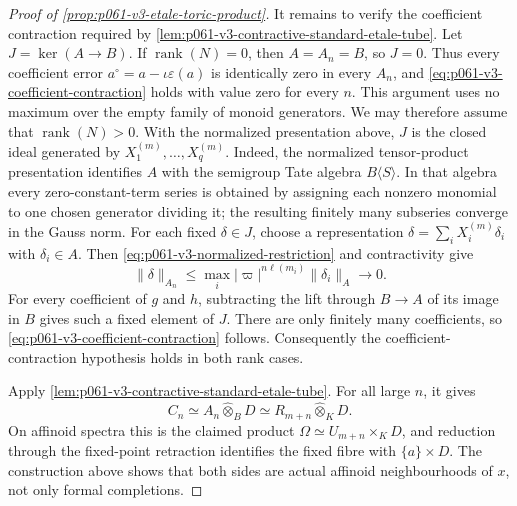 \begin{proof}[Proof of \cref{prop:p061-v3-etale-toric-product}]
It remains to verify the coefficient contraction required by
\cref{lem:p061-v3-contractive-standard-etale-tube}. Let
\(J=\ker(A\to B)\). If \(\operatorname{rank}(N)=0\), then
\(A=A_n=B\), so \(J=0\). Thus every coefficient error
\(a^\circ=a-\iota\varepsilon(a)\) is identically zero in every \(A_n\), and
\eqref{eq:p061-v3-coefficient-contraction} holds with value zero for every
\(n\). This argument uses no maximum over the empty family of monoid
generators. We may therefore assume that \(\operatorname{rank}(N)>0\).
With the normalized presentation above, \(J\) is the
closed ideal generated by \(X_1^{(m)},\ldots,X_q^{(m)}\). Indeed, the
normalized tensor-product presentation identifies \(A\) with the semigroup
Tate algebra \(B\langle S\rangle\). In that algebra every
zero-constant-term series is obtained by
assigning each nonzero monomial to one chosen generator dividing it; the
resulting finitely many subseries converge in the Gauss norm. For each fixed
\(\delta\in J\), choose a representation
\(\delta=\sum_iX_i^{(m)}\delta_i\) with \(\delta_i\in A\). Then
\eqref{eq:p061-v3-normalized-restriction} and contractivity give
\begin{equation}\label{eq:p061-v3-explicit-kernel-decay}
 \|\delta\|_{A_n}
 \leq\max_i
   |\varpi|^{n\ell(m_i)}\|\delta_i\|_A
 \longrightarrow0.
\end{equation}
For every coefficient of \(g\) and \(h\), subtracting the lift through
\(B\to A\) of its image in \(B\) gives such a fixed element of \(J\).
There are only finitely many coefficients, so
\eqref{eq:p061-v3-coefficient-contraction} follows.
Consequently the coefficient-contraction hypothesis holds in both rank
cases.

Apply \cref{lem:p061-v3-contractive-standard-etale-tube}. For all large
\(n\), it gives
\[
 C_n\simeq A_n\widehat\otimes_BD
 \simeq R_{m+n}\widehat\otimes_KD.
\]
On affinoid spectra this is the claimed product
\(\Omega\simeq U_{m+n}\times_KD\), and reduction through the fixed-point
retraction identifies the fixed fibre with \(\{a\}\times D\). The
construction above shows that both sides are actual affinoid
neighbourhoods of \(x\), not only formal completions.


\end{proof}
